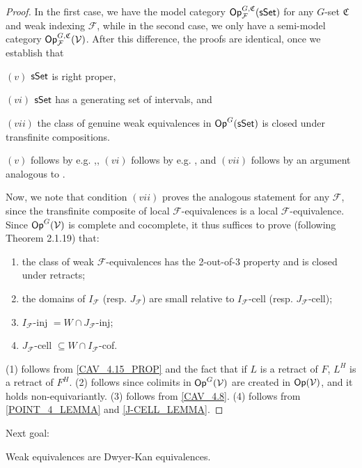 \documentclass[a4paper,10pt
,draft
]{article}%
\renewcommand{\F}{\mathcal F}
\renewcommand{\1}{\ensuremath{\mathbb{id}}}
\begin{document}
\begin{proof}
      In the first case, we have the model category $\Op^{G,\mathfrak C}_\F(\sSet)$
      for any $G$-set $\mathfrak C$ and weak indexing $\F$,
      while in the second case, we only have a semi-model category $\Op^{G, \mathfrak C}_\F(\V)$.
      After this difference, the proofs are identical,
      once we establish that
      \begin{enumerate*}
      \item[$(v)$] $\mathsf{sSet}$ is right proper,
      \item[$(vi)$] $\mathsf{sSet}$ has a generating set of intervals, and
      \item[$(vii)$] the class of genuine weak equivalences in $\mathsf{Op}^G(\mathsf{sSet})$ is closed under transfinite compositions.
      \end{enumerate*}
      $(v)$ follows by e.g. \cite[Prop 2.1.5]{Cis06},,
      $(vi)$ follows by e.g. \cite[Lemma 1.12]{BM13}, and
      $(vii)$ follows by an argument analogous to \cite[Lemma 1.24]{CM13b}.

      Now, we note that condition $(vii)$ proves the analogous statement for any $\F$,
      since the transfinite composite of local $\F$-equivalences is a local $\F$-equivalence.
      Since $\mathsf{Op}^G(\mathcal V)$ is complete and cocomplete, it thus suffices to prove (following \cite{Hov98} Theorem 2.1.19) that:
      \begin{enumerate}[label = (\arabic*)]
      \item the class of weak $\F$-equivalences has the 2-out-of-3 property and is closed under retracts;
      \item the domains of $I_{\F}$ (resp. $J_{\F}$) are small relative to $I_{\F}$-cell (resp. $J_{\F}$-cell);
      \item $I_{\F}$-inj $= W\cap J_{\F}$-inj;
      \item $J_{\F}$-cell $\subseteq W\cap I_{\F}$-cof.
      \end{enumerate}
      (1) follows from \ref{CAV_4.15_PROP} and the fact that if $L$ is a retract of $F$, $L^H$ is a retract of $F^H$.
      (2) follows since colimits in $\mathsf{Op}^G(\mathcal V)$ are created in $\mathsf{Op}(\mathcal V)$, and it holds non-equivariantly.
      (3) follows from \ref{CAV_4.8}.
      (4) follows from \ref{POINT_4_LEMMA} and \ref{J-CELL_LEMMA}.
\end{proof}


Next goal:
\begin{theorem}
      Weak equivalences are Dwyer-Kan equivalences.
\end{theorem}
\end{document}
